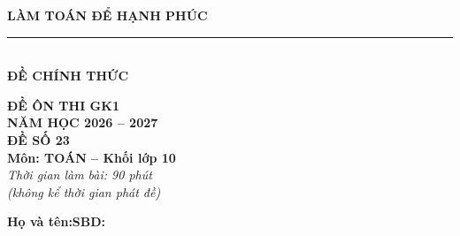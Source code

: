 \documentclass[12pt,a4paper]{article}
\begin{document}
\noindent
\begin{minipage}[c]{0.38\textwidth}
    \centering
    \textbf{LÀM TOÁN ĐỂ HẠNH PHÚC}\\[-2pt]
    \rule{3.2cm}{0.6pt}\\[4pt]
    \textbf{ĐỀ CHÍNH THỨC}
\end{minipage}\hfill
\begin{minipage}[c]{0.35\textwidth}
    \centering
    \textbf{ĐỀ ÔN THI GK1}\\
    \textbf{NĂM HỌC 2026 -- 2027}\\[2pt]
    \textbf{ĐỀ SỐ 23}\\
    \textbf{Môn: TOÁN -- Khối lớp 10}\\
    \textit{\small Thời gian làm bài: 90 phút\\(không kể thời gian phát đề)}
\end{minipage}

\vspace{0.12cm}
\noindent
\begin{minipage}[b]{0.78\textwidth}
    \textbf{Họ và tên:}\dotfill\textbf{SBD:}\makebox[3.5cm]{\dotfill}
\end{minipage}\hfill
\begin{minipage}[b]{0.20\textwidth}
    \hfill
    \setlength{\fboxrule}{0.8pt}%
\end{minipage}
\vspace{0.12cm}
\end{document}
